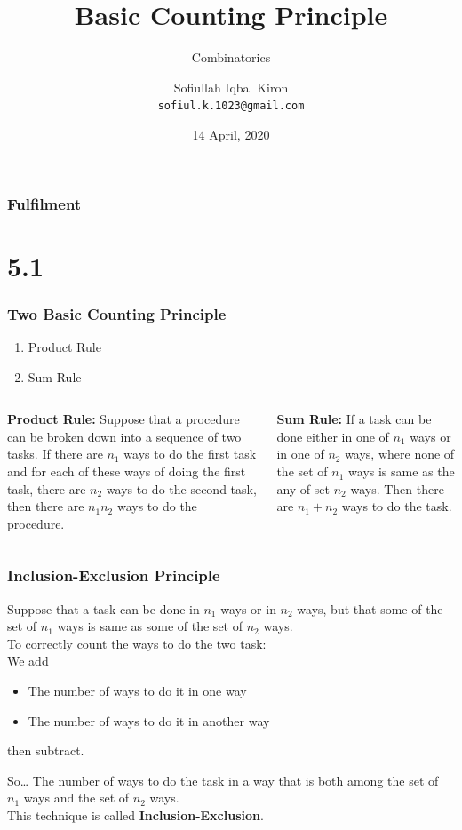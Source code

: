 \documentclass{beamer}
\title[Counting]{Basic Counting Principle}
\subtitle{Combinatorics}
\author[Kiron]{Sofiullah Iqbal Kiron \\ \texttt{sofiul.k.1023@gmail.com}}
\date[Pohela Boishakh]{14 April, 2020}
\institute[BSMRSTU]{Bongobondhu Sheikh Mujibur Rahman Science and Technology University}
\affil{Department of CSE}
\begin{document}
\frame{\titlepage}

\begin{frame}
\frametitle{Fulfilment}
\tableofcontents
\end{frame}

\section{5.1}
\begin{frame}
\frametitle{Two Basic Counting Principle}

\begin{enumerate}
\item Product Rule\pause
\item Sum Rule\pause
\end{enumerate}

\begin{columns}
\textbf{Product Rule:} Suppose that a procedure can be broken down into a sequence of two tasks. If there are $n_1$ ways to do the first task and for each of these ways of doing the first task, there are $n_2$ ways to do the second task, then there are $n_1n_2$ ways to do the procedure.\pause
\transwipe

\textbf{Sum Rule:} If a task can be done either in one of $n_1$ ways or in one of $n_2$ ways, where none of the set of $n_1$ ways is same as the any of set $n_2$ ways. Then there are $n_1+n_2$ ways to do the task.
\end{columns}
\end{frame}

\begin{frame}
\frametitle{Inclusion-Exclusion Principle}
Suppose that a task can be done in $n_1$ ways or in $n_2$ ways, but that some of the set of $n_1$ ways is same as some of the set of $n_2$ ways.
\\
To \alert{correctly count} the ways to do the two task:
\\We add\\
\begin{itemize}
\item<1-> The number of ways to do it in one way
\item<2-> The number of ways to do it in another way
\end{itemize}
then subtract.
\\
\begin{block}{So\dots}
The number of ways to do the task in a way that is both among the set of $n_1$ ways and the set of $n_2$ ways.\\
This technique is called \textbf{Inclusion-Exclusion}.
\end{block}
\end{frame}
\end{document}
